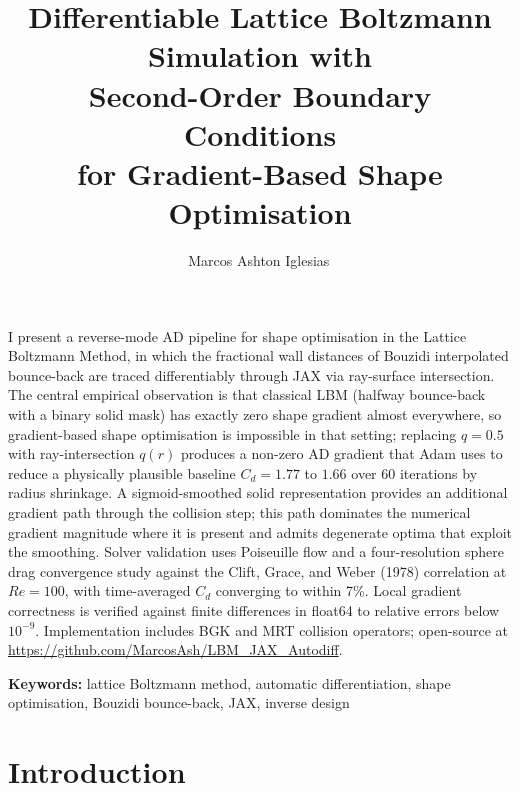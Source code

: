 \documentclass[10pt,twocolumn]{article}
\begin{document}
\title{\textbf{Differentiable Lattice Boltzmann Simulation with\\Second-Order Boundary Conditions\\for Gradient-Based Shape Optimisation}}

\author{Marcos Ashton Iglesias\,}

\date{}
\maketitle

\begin{onecolabstract}
I present a reverse-mode AD pipeline for shape optimisation in the
Lattice Boltzmann Method, in which the fractional wall distances of
Bouzidi interpolated bounce-back are traced differentiably through
JAX via ray-surface intersection. The central empirical observation
is that classical LBM (halfway bounce-back with a binary solid mask)
has exactly zero shape gradient almost everywhere, so gradient-based
shape optimisation is impossible in that setting; replacing
$q = 0.5$ with ray-intersection $q(r)$ produces a non-zero AD
gradient that Adam uses to reduce a physically plausible baseline
$C_d = 1.77$ to $1.66$ over 60 iterations by radius shrinkage. A
sigmoid-smoothed solid representation provides an additional
gradient path through the collision step; this path dominates the
numerical gradient magnitude where it is present and admits
degenerate optima that exploit the smoothing. Solver validation uses
Poiseuille flow and a four-resolution sphere drag convergence study
against the Clift, Grace, and Weber (1978) correlation at $Re = 100$,
with time-averaged $C_d$ converging to within 7\%. Local gradient
correctness is verified against finite differences in float64 to
relative errors below $10^{-9}$. Implementation includes BGK and MRT
collision operators; open-source at
\url{https://github.com/MarcosAsh/LBM_JAX_Autodiff}.

\smallskip\noindent\textbf{Keywords:}
lattice Boltzmann method, automatic differentiation, shape
optimisation, Bouzidi bounce-back, JAX, inverse design
\end{onecolabstract}

\vspace{0.5cm}

\section{Introduction}
\label{sec:intro}
\end{document}
